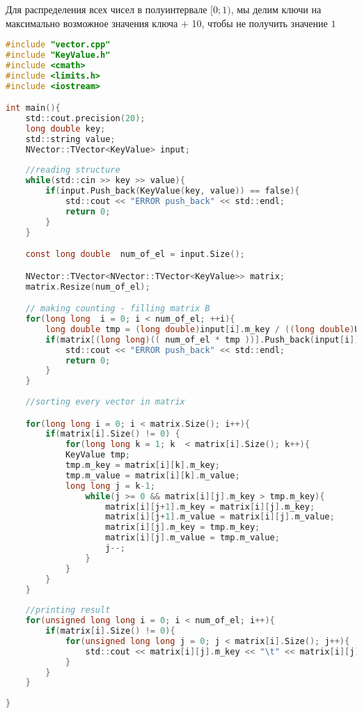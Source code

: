 Для распределения всех чисел в полуинтервале $[0;1)$, мы делим ключи на максимально возможное значения ключа + 10, чтобы не получить значение $1$


\begin{lstlisting}[language=C]
#include "vector.cpp"
#include "KeyValue.h"
#include <cmath>
#include <limits.h>
#include <iostream>      

int main(){
    std::cout.precision(20); 
    long double key;
    std::string value;
    NVector::TVector<KeyValue> input;
	
	//reading structure
    while(std::cin >> key >> value){
        if(input.Push_back(KeyValue(key, value)) == false){
            std::cout << "ERROR push_back" << std::endl;
            return 0;
        }
    }

    const long double  num_of_el = input.Size();

    NVector::TVector<NVector::TVector<KeyValue>> matrix;
    matrix.Resize(num_of_el);

    // making counting - filling matrix B
    for(long long  i = 0; i < num_of_el; ++i){
        long double tmp = (long double)input[i].m_key / ((long double)ULLONG_MAX + 10);
        if(matrix[(long long)(( num_of_el * tmp ))].Push_back(input[i]) == false){
            std::cout << "ERROR push_back" << std::endl;
            return 0;
        }
    }   
    
	//sorting every vector in matrix 

    for(long long i = 0; i < matrix.Size(); i++){
        if(matrix[i].Size() != 0) {
            for(long long k = 1; k  < matrix[i].Size(); k++){
            KeyValue tmp;
            tmp.m_key = matrix[i][k].m_key;
            tmp.m_value = matrix[i][k].m_value;
            long long j = k-1;
                while(j >= 0 && matrix[i][j].m_key > tmp.m_key){
                    matrix[i][j+1].m_key = matrix[i][j].m_key;
                    matrix[i][j+1].m_value = matrix[i][j].m_value;
                    matrix[i][j].m_key = tmp.m_key;
                    matrix[i][j].m_value = tmp.m_value;
                    j--;
                }
            }
        }
    }
    
	//printing result 
    for(unsigned long long i = 0; i < num_of_el; i++){
        if(matrix[i].Size() != 0){
            for(unsigned long long j = 0; j < matrix[i].Size(); j++){
                std::cout << matrix[i][j].m_key << "\t" << matrix[i][j].m_value << std::endl;
            }
        }
    }
    
}
\end{lstlisting}


